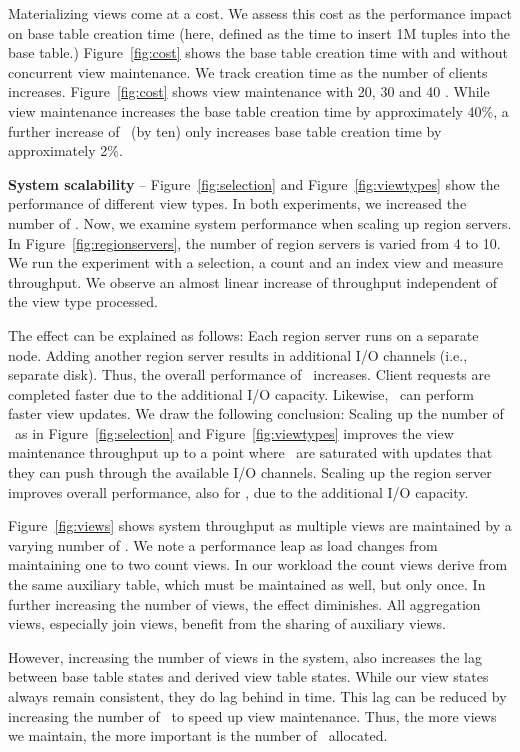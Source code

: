 Materializing views come at a cost. We assess this cost as the
performance impact on base table creation time (here, defined as the
time to insert 1M tuples into the base table.)  Figure~\ref{fig:cost}
shows the base table creation time with and without concurrent view
maintenance.  We track creation time as the number of clients
increases.  Figure~\ref{fig:cost} shows view maintenance with 20, 30
and 40 \VMs.  While view maintenance increases the base table creation
time by approximately 40\%, a further increase of \VMs\ (by ten) only
increases base table creation time by approximately 2\%.

\noindent
{\bf System scalability} -- Figure~\ref{fig:selection} and
Figure~\ref{fig:viewtypes} show the performance of different view
types. In both experiments, we increased the number of \VMs.  Now, we
examine system performance when scaling up region servers. In
Figure~\ref{fig:regionservers}, the number of region servers is varied
from 4 to 10. We run the experiment with a selection, a count and an
index view and measure throughput. We observe an almost linear
increase of throughput independent of the view type processed.

The effect can be explained as follows: Each region server runs on a
separate node. Adding another region server results in additional I/O
channels (i.e., separate disk).  Thus, the overall performance of
\HB\ increases. Client requests are completed faster due to the
additional I/O capacity.  Likewise, \VMs\ can perform faster view
updates.  We draw the following conclusion: Scaling up the number of
\VMs\ as in Figure~\ref{fig:selection} and Figure~\ref{fig:viewtypes}
improves the view maintenance throughput up to a point where \VMs\ are
saturated with updates that they can push through the available I/O
channels.  Scaling up the region server improves overall performance,
also for \VMs, due to the additional I/O capacity.

Figure~\ref{fig:views} shows system throughput as multiple views are
maintained by a varying number of \VMs.  We note a performance leap as
load changes from maintaining one to two count views. In our workload
the count views derive from the same auxiliary table, which must be
maintained as well, but only once. In further increasing the number of
views, the effect diminishes.  All aggregation views, especially join
views, benefit from the sharing of auxiliary views.

However, increasing the number of views in the system, also increases
the lag between base table states and derived view table states. While
our view states always remain consistent, they do lag behind in time.
This lag can be reduced by increasing the number of \VMs\ to speed up
view maintenance.  Thus, the more views we maintain, the more
important is the number of \VMs\ allocated.

